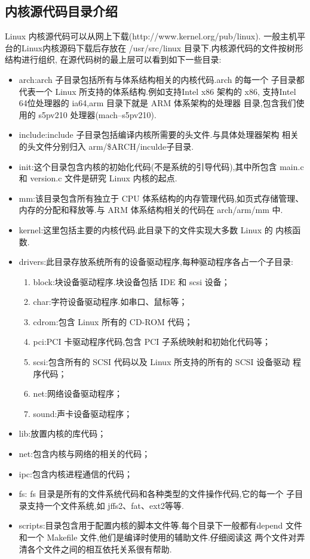 \subsection{内核源代码目录介绍}
	Linux 内核源代码可以从网上下载(http://www.kernel.org/pub/linux).
一般主机平台的Linux内核源码下载后存放在
/usr/src/linux 目录下.内核源代码的文件按树形 结构进行组织,
在源代码树的最上层可以看到如下一些目录:
\begin{itemize}\itemsep=-3pt
  \item arch:arch 子目录包括所有与体系结构相关的内核代码.arch 的每一个
		子目录都代表一个 Linux 所支持的体系结构.例如支持Intel x86 架构的 x86,
        支持Intel 64位处理器的 ia64,arm 目录下就是 ARM 体系架构的处理器
        目录,包含我们使用的 s5pv210 处理器(mach--s5pv210).
  \item include:include 子目录包括编译内核所需要的头文件.与具体处理器架构
        相关的头文件分别归入 arm/\$ARCH/inculde子目录.
  \item init:这个目录包含内核的初始化代码(不是系统的引导代码),其中所包含
		main.c 和 version.c 文件是研究 Linux 内核的起点.
  \item mm:该目录包含所有独立于 CPU 体系结构的内存管理代码,如页式存储管理、
		内存的分配和释放等.与 ARM 体系结构相关的代码在 arch/arm/mm 中.
  \item kernel:这里包括主要的内核代码.此目录下的文件实现大多数 Linux 的
		内核函数.
  \item drivers:此目录存放系统所有的设备驱动程序,每种驱动程序各占一个子目录:
  \begin{enumerate}\itemsep=-3pt
  \item block:块设备驱动程序.块设备包括 IDE 和 scsi 设备；
  \item char:字符设备驱动程序.如串口、鼠标等；
  \item cdrom:包含 Linux 所有的 CD-ROM 代码；
  \item pci:PCI 卡驱动程序代码,包含 PCI 子系统映射和初始化代码等；
  \item scsi:包含所有的 SCSI 代码以及 Linux 所支持的所有的 SCSI 设备驱动
		程序代码；
  \item net:网络设备驱动程序；
  \item sound:声卡设备驱动程序；
  \end{enumerate}
  \item lib:放置内核的库代码；
  \item net:包含内核与网络的相关的代码；
  \item ipc:包含内核进程通信的代码；
  \item fs: fs 目录是所有的文件系统代码和各种类型的文件操作代码,它的每一个
		子目录支持一个文件系统,如 jffs2、fat、ext2等等.
  \item scripts:目录包含用于配置内核的脚本文件等.每个目录下一般都有depend
		文件和一个 Makefile 文件,他们是编译时使用的辅助文件.仔细阅读这
		两个文件对弄清各个文件之间的相互依托关系很有帮助.
\end{itemize}

